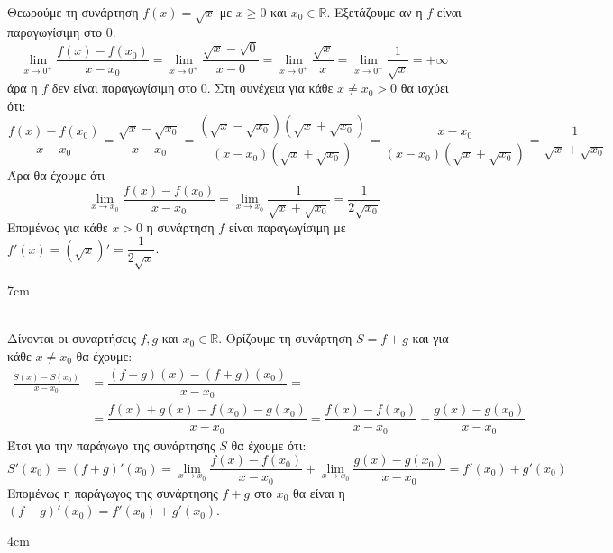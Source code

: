 \textbf{}\\
Θεωρούμε τη συνάρτηση $ f(x)=\sqrt{x} $ με $ x\geq 0 $ και $ x_0\in\mathbb{R} $. 
Εξετάζουμε αν η $ f $ είναι παραγωγίσιμη στο $ 0 $.
\[ \lim_{x\to 0^+}\frac{f(x)-f(x_0)}{x-x_0}=\lim_{x\to 0^+}{\frac{\sqrt{x}-\sqrt{0}}{x-0}}=\lim_{x\to 0^+}{\frac{\sqrt{x}}{x}}=
\lim_{x\to 0^+}{\frac{1}{\sqrt{x}}}=+\infty \]
άρα η $ f $ δεν είναι παραγωγίσιμη στο $ 0 $.
Στη συνέχεια για κάθε $ x\neq x_0>0 $ θα ισχύει ότι:
\[ \frac{f(x)-f(x_0)}{x-x_0}=\dfrac{\sqrt{x}-\sqrt{x_0}}{x-x_0}=\dfrac{\left(\sqrt{x}-\sqrt{x_0}\right)\left(\sqrt{x}+\sqrt{x_0} \right) }{(x-x_0)\left( \sqrt{x}+\sqrt{x_0}\right)}=\dfrac{x-x_0}{(x-x_0)\left( \sqrt{x}+\sqrt{x_0}\right)}=\dfrac{1}{ \sqrt{x}+\sqrt{x_0}} \]
Άρα θα έχουμε ότι
\[ \lim_{x\to x_0}{\dfrac{f(x)-f(x_0)}{x-x_0}}=\lim_{x\to x_0}{\dfrac{1}{\sqrt{x}+\sqrt{x_0}}}=\dfrac{1}{2\sqrt{x_0}} \]
Επομένως για κάθε $ x>0 $ η συνάρτηση $ f $ είναι παραγωγίσιμη με $ f'(x)=\left( \sqrt{x}\right)'=\dfrac{1}{2\sqrt{x}} $. 
\begin{Thewrhmabox}{7cm}
\label{thewrhma:paragwgos_athroismatos}
\end{Thewrhmabox}
\textbf{}\\
Δίνονται οι συναρτήσεις $ f,g $ και $ x_0\in\mathbb{R} $. Ορίζουμε τη συνάρτηση $ S=f+g $ και για κάθε $ x\neq x_0 $ θα έχουμε:
\begin{align*}
\frac{S(x)-S(x_0)}{x-x_0}&=\dfrac{(f+g)(x)-(f+g)(x_0)}{x-x_0}=\\
&=\dfrac{f(x)+g(x)-f(x_0)-g(x_0)}{x-x_0}=\dfrac{f(x)-f(x_0)}{x-x_0}+\dfrac{g(x)-g(x_0)}{x-x_0}
\end{align*}
Έτσι για την παράγωγο της συνάρτησης $ S $ θα έχουμε ότι:
\[ S'(x_0)=(f+g)'(x_0)=\lim_{x\to x_0}{\dfrac{f(x)-f(x_0)}{x-x_0}}+\lim_{x\to x_0}{\dfrac{g(x)-g(x_0)}{x-x_0}}=f'(x_0)+g'(x_0) \]
Επομένως η παράγωγος της συνάρτησης $ f+g $ στο $ x_0 $ θα είναι η $ (f+g)'(x_0)=f'(x_0)+g'(x_0) $.
\begin{Thewrhmabox}{4cm}
\label{thewrhma:paragwgos_dynamhs_arnhtikos}
\end{Thewrhmabox}
\textbf{}\\
